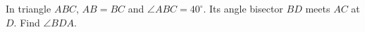 In triangle $ABC$, $AB=BC$ and $\angle ABC=40^\circ$. Its angle bisector $BD$ meets $AC$ at $D$. Find $\angle BDA$.
